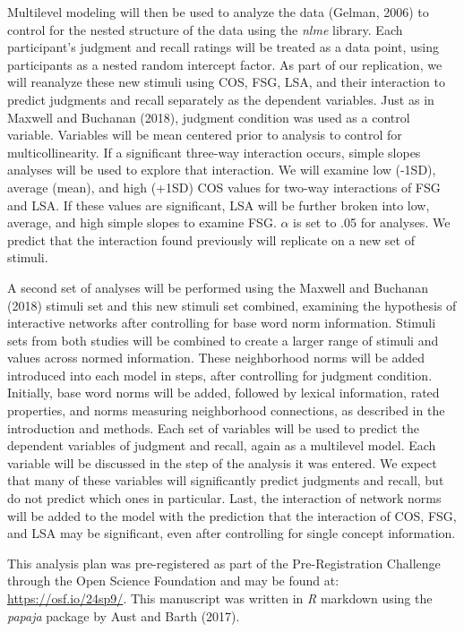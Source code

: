 \documentclass[english,man]{apa6}
\theoremstyle{definition}
\theoremstyle{definition}
\theoremstyle{definition}
\theoremstyle{remark}
\begin{document}
Multilevel modeling will then be used to analyze the data (Gelman, 2006)
to control for the nested structure of the data using the \emph{nlme}
library. Each participant's judgment and recall ratings will be treated
as a data point, using participants as a nested random intercept factor.
As part of our replication, we will reanalyze these new stimuli using
COS, FSG, LSA, and their interaction to predict judgments and recall
separately as the dependent variables. Just as in Maxwell and Buchanan
(2018), judgment condition was used as a control variable. Variables
will be mean centered prior to analysis to control for
multicollinearity. If a significant three-way interaction occurs, simple
slopes analyses will be used to explore that interaction. We will
examine low (-1SD), average (mean), and high (+1SD) COS values for
two-way interactions of FSG and LSA. If these values are significant,
LSA will be further broken into low, average, and high simple slopes to
examine FSG. \(\alpha\) is set to .05 for analyses. We predict that the
interaction found previously will replicate on a new set of stimuli.

A second set of analyses will be performed using the Maxwell and
Buchanan (2018) stimuli set and this new stimuli set combined, examining
the hypothesis of interactive networks after controlling for base word
norm information. Stimuli sets from both studies will be combined to
create a larger range of stimuli and values across normed information.
These neighborhood norms will be added introduced into each model in
steps, after controlling for judgment condition. Initially, base word
norms will be added, followed by lexical information, rated properties,
and norms measuring neighborhood connections, as described in the
introduction and methods. Each set of variables will be used to predict
the dependent variables of judgment and recall, again as a multilevel
model. Each variable will be discussed in the step of the analysis it
was entered. We expect that many of these variables will significantly
predict judgments and recall, but do not predict which ones in
particular. Last, the interaction of network norms will be added to the
model with the prediction that the interaction of COS, FSG, and LSA may
be significant, even after controlling for single concept information.

This analysis plan was pre-registered as part of the Pre-Registration
Challenge through the Open Science Foundation and may be found at:
\url{https://osf.io/24sp9/}. This manuscript was written in \emph{R}
markdown using the \emph{papaja} package by Aust and Barth (2017).
\end{document}
